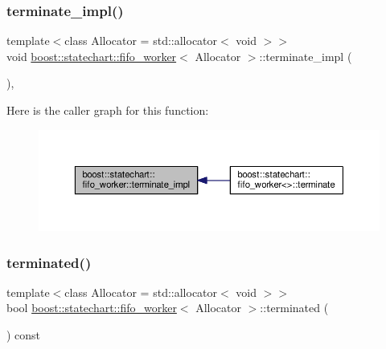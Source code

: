 \subsubsection{\texorpdfstring{terminate\+\_\+impl()}{terminate\_impl()}}
{\footnotesize\ttfamily template$<$class Allocator = std\+::allocator$<$ void $>$$>$ \\
void \mbox{\hyperlink{classboost_1_1statechart_1_1fifo__worker}{boost\+::statechart\+::fifo\+\_\+worker}}$<$ Allocator $>$\+::terminate\+\_\+impl (\begin{DoxyParamCaption}{ }\end{DoxyParamCaption})\hspace{0.3cm}{\ttfamily [inline]}, {\ttfamily [private]}}

Here is the caller graph for this function\+:
\nopagebreak
\begin{figure}[H]
\begin{center}
\leavevmode
\includegraphics[width=350pt]{classboost_1_1statechart_1_1fifo__worker_ab220ce19cda37ceabc0da940109d7d05_icgraph}
\end{center}
\end{figure}
\mbox{\label{classboost_1_1statechart_1_1fifo__worker_ac05ccf21dfcce48372f3022642e0c135}} 
\subsubsection{\texorpdfstring{terminated()}{terminated()}}
{\footnotesize\ttfamily template$<$class Allocator = std\+::allocator$<$ void $>$$>$ \\
bool \mbox{\hyperlink{classboost_1_1statechart_1_1fifo__worker}{boost\+::statechart\+::fifo\+\_\+worker}}$<$ Allocator $>$\+::terminated (\begin{DoxyParamCaption}{ }\end{DoxyParamCaption}) const\hspace{0.3cm}{\ttfamily [inline]}}

